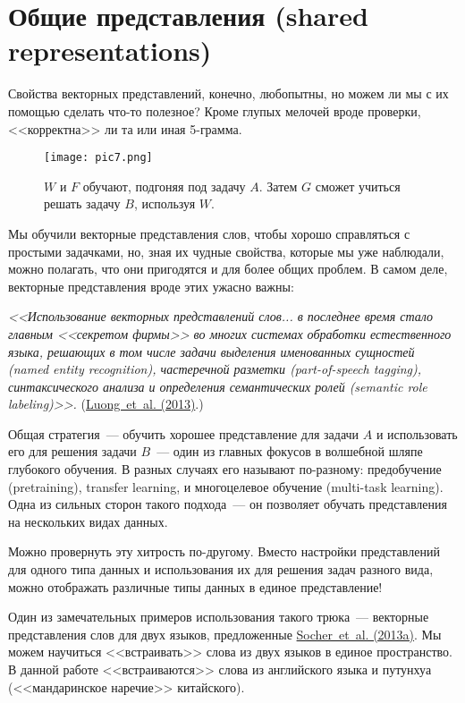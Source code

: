 \documentclass[a4paper,12pt]{article}
\begin{document}
\section*{Общие представления (shared representations)}

Свойства векторных представлений, конечно, любопытны, но можем ли мы с их помощью сделать что-то полезное? Кроме глупых мелочей вроде проверки, <<корректна>> ли та или иная 5-грамма.

\begin{figure}[t]
\begin{center}
\texttt{[image: pic7.png]}
\caption{$W$ и $F$ обучают, подгоняя под задачу $A$. Затем $G$ сможет учиться решать задачу $B$, используя $W$.}
\end{center}
\end{figure}

Мы обучили векторные представления слов, чтобы хорошо справляться с простыми задачками, но, зная их чудные свойства, которые мы уже наблюдали, можно полагать, что они пригодятся и для более общих проблем. В самом деле, векторные представления вроде этих ужасно важны:

{\it
<<Использование векторных представлений слов... в последнее время стало главным <<секретом фирмы>> во многих системах обработки естественного языка, решающих в том числе задачи выделения именованных сущностей (named entity recognition), частеречной разметки (part-of-speech tagging), синтаксического анализа и определения семантических ролей (semantic role labeling)>>. }(\href{http://nlp.stanford.edu/~lmthang/data/papers/conll13_morpho.pdf}{Luong~et~al. (2013)}.)

Общая стратегия~--- обучить хорошее представление для задачи $A$ и использовать его для решения задачи $B$~--- один из главных фокусов в волшебной шляпе глубокого обучения. В разных случаях его называют по-разному: предобучение (pretraining),  transfer learning, и многоцелевое обучение (multi-task learning). Одна из сильных сторон такого подхода~--- он позволяет обучать представления на нескольких видах данных.

Можно провернуть эту хитрость по-другому. Вместо настройки представлений для одного типа данных и использования их для решения задач разного вида, можно отображать различные типы данных в единое представление!

Один из замечательных примеров использования такого трюка~--- векторные представления слов для двух языков, предложенные \href{http://ai.stanford.edu/~wzou/emnlp2013_ZouSocherCerManning.pdf}{Socher~et~al. (2013a)}. Мы можем научиться <<встраивать>> слова из двух языков в единое пространство. В данной работе <<встраиваются>> слова из английского языка и путунхуа (<<мандаринское наречие>> китайского).
\end{document}
